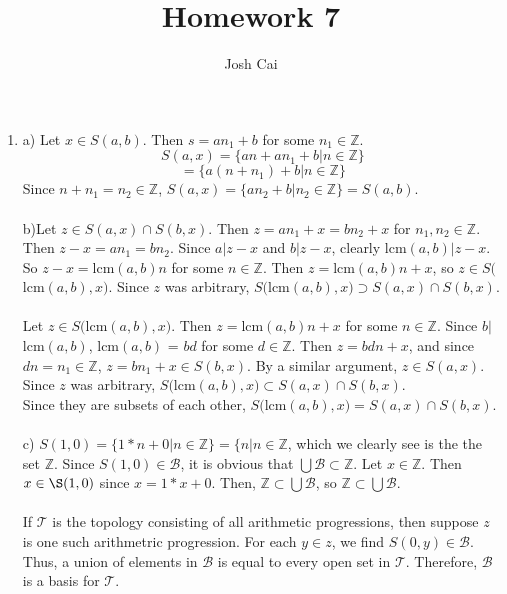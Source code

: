 \documentclass{article}
\begin{document}
\title{Homework 7}
\author{Josh Cai}

\maketitle


\begin{enumerate}
\item
a) Let $x\in S(a,b)$. Then $s = an_1+b$ for some $n_1 \in \mathbb{Z}$. \[S(a,x) = \{an+an_1+b|n \in \mathbb{Z}\}\]
\[=\{a(n+n_1)+b|n\in\mathbb{Z}\}\]
Since $n+n_1=n_2 \in \mathbb{Z}$, $S(a,x) = \{an_2+b|n_2\in\mathbb{Z}\} = S(a,b)$.
\\\\b)Let $z \in S(a,x)\cap S(b,x)$. Then $z = an_1+x = bn_2+x$ for $n_1,n_2 \in \mathbb{Z}$. Then $z-x = an_1 = bn_2$. Since $a|z-x$ and $b|z-x$, clearly lcm$(a,b)|z-x$. So $z-x =$lcm$(a,b)n$ for some $n \in \mathbb{Z}$. Then $z =$lcm$(a,b)n+x$, so $z\in S($lcm$(a,b),x)$. Since $z$ was arbitrary, $S($lcm$(a,b),x) \supset S(a,x)\cap S(b,x)$.
\\\\Let $z\in S($lcm$(a,b),x)$. Then $z =$lcm$(a,b)n+x$ for some $n\in\mathbb{Z}$. Since $b|$lcm$(a,b)$, lcm$(a,b)$ = $bd$ for some $d\in\mathbb{Z}$. Then $z = bdn+x$, and since $dn = n_1 \in\mathbb{Z}$, $z = bn_1+x\in S(b,x)$. By a similar argument, $z \in S(a,x)$. Since $z$ was arbitrary, $S($lcm$(a,b),x) \subset S(a,x)\cap S(b,x)$.
\\Since they are subsets of each other, $ S($lcm$(a,b),x) = S(a,x)\cap S(b,x)$.
\\\\c) $S(1,0) = \{1*n+0|n\in\mathbb{Z}\} = \{n|n\in\mathbb{Z}$, which we clearly see is the the set $\mathbb{Z}$. Since $S(1,0)\in\mathcal{B}$, it is obvious that $\bigcup\mathcal{B} \subset \mathbb{Z}$. Let $x\in \mathbb{Z}$. Then $x \in \S(1,0)$ since $x = 1*x + 0$. Then, $\mathbb{Z}\subset\bigcup\mathcal{B}$, so $\mathbb{Z}\subset\bigcup\mathcal{B}$.
\\\\If $\mathcal{T}$ is the topology consisting of all arithmetic progressions, then suppose $z$ is one such arithmetric progression. For each $y \in z$, we find $S(0,y) \in \mathcal{B}$. Thus, a union of elements in $\mathcal{B}$ is equal to every open set in $\mathcal{T}$. Therefore, $\mathcal{B}$ is a basis for $\mathcal{T}$.


\end{enumerate}
\end{document}
